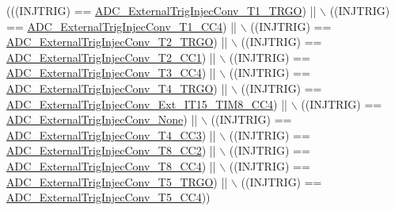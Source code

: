 \begin{DoxyCode}
(((INJTRIG) == \hyperlink{group___a_d_c__external__trigger__sources__for__injected__channels__conversion_gabf47f66e60c166f6b63b805f72ad94b0}{ADC\_ExternalTrigInjecConv\_T1\_TRGO}) || \(\backslash\)
                                        ((INJTRIG) == 
      \hyperlink{group___a_d_c__external__trigger__sources__for__injected__channels__conversion_gabd27bcc6ff5af6713a124b3801759bcf}{ADC\_ExternalTrigInjecConv\_T1\_CC4}) || \(\backslash\)
                                        ((INJTRIG) == 
      \hyperlink{group___a_d_c__external__trigger__sources__for__injected__channels__conversion_gaaad112b2b035dfd77c9743197c51b16f}{ADC\_ExternalTrigInjecConv\_T2\_TRGO}) || \(\backslash\)
                                        ((INJTRIG) == 
      \hyperlink{group___a_d_c__external__trigger__sources__for__injected__channels__conversion_ga49089501c5bf2a2c22019fbca4b688e9}{ADC\_ExternalTrigInjecConv\_T2\_CC1}) || \(\backslash\)
                                        ((INJTRIG) == 
      \hyperlink{group___a_d_c__external__trigger__sources__for__injected__channels__conversion_ga6c9ddf9bba0cefe77dbcd601aed24f7b}{ADC\_ExternalTrigInjecConv\_T3\_CC4}) || \(\backslash\)
                                        ((INJTRIG) == 
      \hyperlink{group___a_d_c__external__trigger__sources__for__injected__channels__conversion_gab12e5503085cdb9dde4a59614e421284}{ADC\_ExternalTrigInjecConv\_T4\_TRGO}) || \(\backslash\)
                                        ((INJTRIG) == 
      \hyperlink{group___a_d_c__external__trigger__sources__for__injected__channels__conversion_gaa23965b742e08142e5d1c453166dbcc2}{ADC\_ExternalTrigInjecConv\_Ext\_IT15\_TIM8\_CC4}) || \(\backslash\)
                                        ((INJTRIG) == 
      \hyperlink{group___a_d_c__external__trigger__sources__for__injected__channels__conversion_gaad11a68fca76d97b97dc2554dac5cb16}{ADC\_ExternalTrigInjecConv\_None}) || \(\backslash\)
                                        ((INJTRIG) == 
      \hyperlink{group___a_d_c__external__trigger__sources__for__injected__channels__conversion_gae342ca48595f0b2bf866943969026581}{ADC\_ExternalTrigInjecConv\_T4\_CC3}) || \(\backslash\)
                                        ((INJTRIG) == 
      \hyperlink{group___a_d_c__external__trigger__sources__for__injected__channels__conversion_gac0320df9aa5e2d378b05f8e4dcc1616a}{ADC\_ExternalTrigInjecConv\_T8\_CC2}) || \(\backslash\)
                                        ((INJTRIG) == 
      \hyperlink{group___a_d_c__external__trigger__sources__for__injected__channels__conversion_ga6724679fe75f87c029f268ef47841a3e}{ADC\_ExternalTrigInjecConv\_T8\_CC4}) || \(\backslash\)
                                        ((INJTRIG) == 
      \hyperlink{group___a_d_c__external__trigger__sources__for__injected__channels__conversion_ga1d92236e9eb9f3adf69371f3f698192e}{ADC\_ExternalTrigInjecConv\_T5\_TRGO}) || \(\backslash\)
                                        ((INJTRIG) == 
      \hyperlink{group___a_d_c__external__trigger__sources__for__injected__channels__conversion_gade68a960ba05714e5f0a1f11a086884e}{ADC\_ExternalTrigInjecConv\_T5\_CC4}))
\end{DoxyCode}


